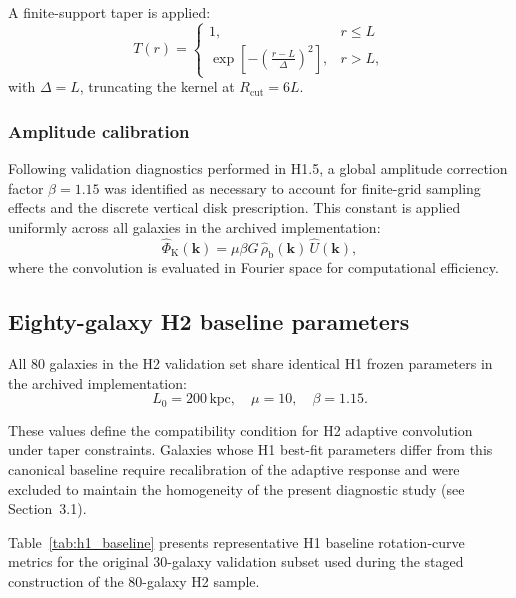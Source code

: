 \documentclass[twocolumn,linenumbers]{aastex701}
\begin{document}
A finite-support taper is applied:
\begin{equation}
	T(r) =
	\begin{cases}
		1, & r \le L \\
		\exp\left[-\left(\frac{r - L}{\Delta}\right)^2\right], & r > L,
	\end{cases}
	\label{eq:taper}
\end{equation}
with $\Delta = L$, truncating the kernel at $R_{\mathrm{cut}} = 6L$.

\subsubsection{Amplitude calibration}

Following validation diagnostics performed in H1.5, a global amplitude
correction factor $\beta = 1.15$ was identified as necessary to account for
finite-grid sampling effects and the discrete vertical disk prescription. This
constant is applied uniformly across all galaxies in the archived
implementation:
\begin{equation}
	\hat{\Phi}_{\mathrm{K}}(\mathbf{k}) = \mu \beta G\,
	\hat{\rho}_{\mathrm{b}}(\mathbf{k})\, \hat{U}(\mathbf{k}),
	\label{eq:fourier_beta}
\end{equation}
where the convolution is evaluated in Fourier space for computational
efficiency.

\subsection{Eighty-galaxy H2 baseline parameters}

All 80 galaxies in the H2 validation set share identical H1 frozen parameters
in the archived implementation:
\begin{equation}
	L_0 = 200\,\mathrm{kpc}, \quad \mu = 10, \quad \beta = 1.15.
	\label{eq:h2_baseline_params}
\end{equation}

These values define the compatibility condition for H2 adaptive convolution
under taper constraints. Galaxies whose H1 best-fit parameters differ from
this canonical baseline require recalibration of the adaptive response and
were excluded to maintain the homogeneity of the present diagnostic study
(see Section~3.1).

Table~\ref{tab:h1_baseline} presents representative H1 baseline
rotation-curve metrics for the original 30-galaxy validation subset used
during the staged construction of the 80-galaxy H2 sample.
\end{document}
